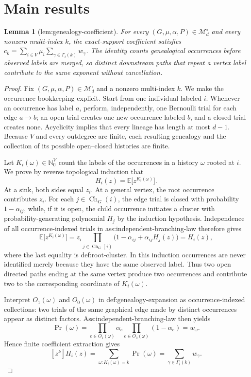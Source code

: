 \documentclass{article}
\newtheorem{lemma}{Lemma}
\begin{document}
\section{Main results}

\begin{lemma}[lem:genealogy-coefficient]\label{lem:genealogy-coefficient}
For every \((G,\mu,\alpha,P)\in\mathcal M_d^\circ\) and every nonzero multi-index \(k\), the exact-support coefficient satisfies \(c_k=\sum_{i\in V}\mu_i\sum_{\gamma\in\Gamma_i(k)}w_\gamma\). The identity counts genealogical occurrences before observed labels are merged, so distinct downstream paths that repeat a vertex label contribute to the same exponent without cancellation.
\end{lemma}
\begin{proof}
Fix \((G,\mu,\alpha,P)\in\mathcal M_d^\circ\) and a nonzero multi-index \(k\).  We make the occurrence bookkeeping explicit.  Start from one individual labeled \(i\).  Whenever an occurrence has label \(a\), perform, independently, one Bernoulli trial for each edge \(a\to b\); an open trial creates one new occurrence labeled \(b\), and a closed trial creates none.  Acyclicity implies that every lineage has length at most \(d-1\).  Because \(V\) and every outdegree are finite, each resulting genealogy and the collection of its possible open--closed histories are finite.

Let \(K_i(\omega)\in\mathbb N_0^V\) count the labels of the occurrences in a history \(\omega\) rooted at \(i\).  We prove by reverse topological induction that
\[
 H_i(z)=\mathbb E\bigl[z^{K_i(\omega)}\bigr].
\]
At a sink, both sides equal \(z_i\).  At a general vertex, the root occurrence contributes \(z_i\).  For each \(j\in\operatorname{Ch}_G(i)\), the edge trial is closed with probability \(1-\alpha_{ij}\), while, if it is open, the child occurrence initiates a cluster with probability-generating polynomial \(H_j\) by the induction hypothesis.  Independence of all occurrence-indexed trials in ass:independent-branching-law therefore gives
\[
 \mathbb E\bigl[z^{K_i(\omega)}\bigr]
 =z_i\prod_{j\in\operatorname{Ch}_G(i)}
       \bigl(1-\alpha_{ij}+\alpha_{ij}H_j(z)\bigr)
 =H_i(z),
\]
where the last equality is def:root-cluster.  In this induction occurrences are never identified merely because they have the same observed label.  Thus two open directed paths ending at the same vertex produce two occurrences and contribute two to the corresponding coordinate of \(K_i(\omega)\).

Interpret \(O_1(\omega)\) and \(O_0(\omega)\) in def:genealogy-expansion as occurrence-indexed collections: two trials of the same graphical edge made by distinct occurrences appear as distinct factors.  Ass:independent-branching-law then yields
\[
 \Pr(\omega)
 =\prod_{e\in O_1(\omega)}\alpha_e
   \prod_{e\in O_0(\omega)}(1-\alpha_e)
 =w_\omega.
\]
Hence finite coefficient extraction gives
\[
 [z^k]H_i(z)
 =\sum_{\omega:K_i(\omega)=k}\Pr(\omega)
 =\sum_{\gamma\in\Gamma_i(k)}w_\gamma.
\tag{1}
\]


\end{proof}
\end{document}
